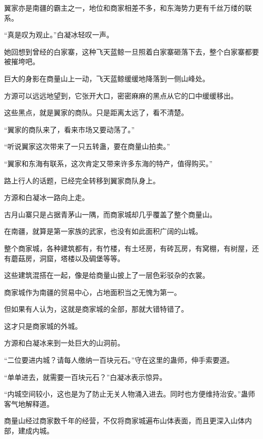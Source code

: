 \begin{this_body}
翼家亦是南疆的霸主之一，地位和商家相差不多，和东海势力更有千丝万缕的联系。

“真是叹为观止。”白凝冰轻叹一声。

她回想到曾经的白家寨，这种飞天蓝鲸一旦照着白家寨砸落下去，整个白家寨都要被摧垮吧。

巨大的身影在商量山上一动，飞天蓝鲸缓缓地降落到一侧山峰处。

方源可以远远地望到，它张开大口，密密麻麻的黑点从它的口中缓缓移出。

这些黑点，就是翼家的商队。只是距离太远了，看不清楚。

“翼家的商队来了，看来市场又要动荡了。”

“听说翼家这次带来了一只五转蛊，要在商量山拍卖。”

“翼家和东海有联系，这次肯定又带来许多东海的特产，值得购买。”

路上行人的话题，已经完全转移到翼家商队身上。

方源和白凝冰一路向上走。

古月山寨只是占据青茅山一隅，而商家城却几乎覆盖了整个商量山。

在南疆，就算是第一家族的武家，也没有如此面积广阔的山城。

整个商家城，各种建筑都有，有竹楼，有土坯房，有砖瓦房，有窝棚，有树屋，还有蘑菇房，洞窟，塔楼以及碉堡等等。

这些建筑混搭在一起，像是给商量山披上了一层色彩驳杂的衣裳。

商家城作为南疆的贸易中心，占地面积当之无愧为第一。

但如果有人认为，这就是商家城的全部，那就大错特错了。

这才只是商家城的外城。

方源和白凝冰来到一处巨大的山洞前。

“二位要进内城？请每人缴纳一百块元石。”守在这里的蛊师，伸手索要道。

“单单进去，就需要一百块元石？”白凝冰表示惊异。

“内城空间较小，这也是为了防止无关人物涌入进去。同时也方便维持治安。”蛊师客气地解释道。

商量山经过商家数千年的经营，不仅将商家城遍布山体表面，而且更深入山体内部，建成内城。

\end{this_body}

